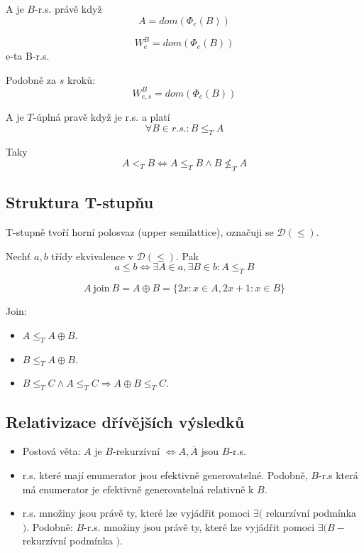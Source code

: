 \begin{definition}
	A je $B$-r.s. právě když
	\[ A = dom(\Phi_e(B)) \]
\end{definition}

\begin{notation}
	\[ W^B_e = dom(\Phi_e(B)) \]
	e-ta B-r.s.

	Podobně za $s$ kroků:
	\[ W^B_{e, s} = dom(\Phi_e(B)) \]
\end{notation}

\begin{definition}[T-úplnost]
	A je $T$-úplná pravě když je r.s. a platí
	\[ \forall B \in r.s.: B \leq_T A \]

	Taky
	\[ A <_T B \iff A \leq_T B \land B \nleq_T A \]
\end{definition}

\subsection{Struktura T-stupňu}

T-stupně tvoří horní polosvaz (upper semilattice), označuji se $\mathcal{D}(\leq)$.
\begin{definition}
	Nechť $a, b$ třídy ekvivalence v $\mathcal{D}(\leq)$.
	Pak
	\[ a \leq b \iff \exists A \in a, \exists B \in b: A \leq_T B \]
\end{definition}

\begin{definition}[Join]
	\[ A \ \text{join}\ B = A \oplus B = \{ 2x: x \in A, 2x + 1: x \in B \} \]
\end{definition}

\begin{properties}
	Join:
	\begin{itemize}
		\item $A \leq_T A \oplus B$.
		\item $B \leq_T A \oplus B$.
		\item $B \leq_T C \land A \leq_T C \Rightarrow A \oplus B \leq_T C$.
	\end{itemize}
\end{properties}

\subsection{Relativizace dřívějších výsledků}

\begin{properties}\label{rel_prop}
\begin{itemize}
	\item Postová věta:
		$A$ je $B$-rekurzívní $\iff A, \overline{A}$ jsou $B$-r.s.
	\item r.s. které mají enumerator jsou efektivně generovatelné.
		Podobně, $B$-r.s která má enumerator je efektivně generovatelná relativně k $B$.
	\item r.s. množiny jsou právě ty, které lze vyjádřit pomoci $\exists ($ rekurzívní podmínka $)$.
		Podobně: $B$-r.s. množiny jsou právě ty, které lze vyjádřit pomoci $\exists (B-$rekurzívní podmínka $)$.
\end{itemize}
\end{properties}

